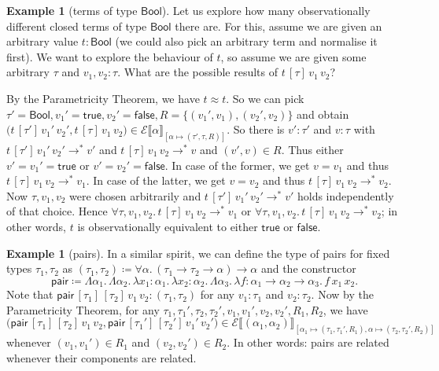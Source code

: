 \documentclass[12pt]{article}
\theoremstyle{plain}
\theoremstyle{definition}
\newtheorem{exmpl}[equation]{Example}
\newcommand{\denot}[1]{\llbracket#1\rrbracket}
\newcommand{\tint}[1]{\mathcal{E}\denot{#1}}
\newcommand{\bool}{\mathsf{Bool}}
\newcommand{\pair}{\mathsf{pair}}
\newcommand{\true}{\mathsf{true}}
\newcommand{\false}{\mathsf{false}}
\begin{document}
\begin{exmpl}[terms of type $\bool$]\label{exmpl:boolterms}
Let us explore how many observationally different closed terms of type $\bool$ there are.
For this, assume we are given an arbitrary value $t : \bool$ (we could also pick an arbitrary term and normalise it first).
We want to explore the behaviour of $t$, so assume we are given some arbitrary $\tau$ and $v_1,v_2 : \tau$.
What are the possible results of $t \,[\tau]\,v_1\,v_2$?

By the Parametricity Theorem, we have $t\approx t$.
So we can pick $\tau'=\bool,v_1'=\true,\allowbreak v_2'=\false,R=\{(v_1',v_1),(v_2',v_2)\}$
and obtain $\bigl(t \,[\tau']\,v_1'\,v_2',t \,[\tau]\,v_1\,v_2\bigr)\in\tint{\alpha}_{[\alpha\mapsto(\tau',\tau,R)]}$.
So there is $v' : \tau'$ and $v : \tau$ with $t \,[\tau']\,v_1'\,v_2'\to^*v'$ and $t \,[\tau]\,v_1\,v_2\to^*v$ and $(v',v)\in R$.
Thus either $v'=v_1'=\true$ or $v'=v_2'=\false$.
In case of the former, we get $v=v_1$ and thus $t \,[\tau]\,v_1\,v_2\to^*v_1$.
In case of the latter, we get $v=v_2$ and thus $t \,[\tau]\,v_1\,v_2\to^*v_2$.
Now $\tau,v_1,v_2$ were chosen arbitrarily and $t\,[\tau']\,v_1'\,v_2'\to^*v'$
holds independently of that choice.
Hence $\forall \tau,v_1,v_2.\, t\,[\tau]\,v_1\,v_2\to^*v_1$ or $\forall \tau,v_1,v_2.\, t\,[\tau]\,v_1\,v_2\to^*v_2$;
in other words, $t$ is observationally equivalent to either $\true$ or $\false$.
\end{exmpl}
\begin{exmpl}[pairs]
In a similar spirit, we can define the type of pairs for fixed types $\tau_1,\tau_2$ as $(\tau_1,\tau_2)\coloneqq \forall \alpha.\, (\tau_1\to\tau_2\to\alpha)\to\alpha$
and the constructor
\begin{equation*}
\pair \coloneqq \Lambda \alpha_1.\,\Lambda \alpha_2.\, \lambda x_1 : \alpha_1.\,\lambda x_2 : \alpha_2.\, \Lambda \alpha_3.\,\lambda f : \alpha_1\to\alpha_2\to\alpha_3.\, f\,x_1\,x_2.
\end{equation*}
Note that $\pair \,[\tau_1]\,[\tau_2]\,v_1\,v_2 : (\tau_1,\tau_2)$ for any $v_1 : \tau_1$ and $v_2 : \tau_2$.
Now by the Parametricity Theorem, for any $\tau_1,\tau_1',\tau_2,\tau_2',\allowbreak v_1,v_1',v_2,v_2',R_1,R_2$,
we have
\begin{equation*}
\bigl(\pair \,[\tau_1]\,[\tau_2]\,v_1\,v_2,\pair \,[\tau_1']\,[\tau_2']\,v_1'\,v_2'\bigr)\in\tint{(\alpha_1,\alpha_2)}_{[\alpha_1\mapsto(\tau_1,\tau_1',R_1),\alpha\mapsto(\tau_2,\tau_2',R_2)]}
\end{equation*}
whenever $(v_1,v_1')\in R_1$ and $(v_2,v_2')\in R_2$.
In other words: pairs are related whenever their components are related.
\end{exmpl}
\end{document}
